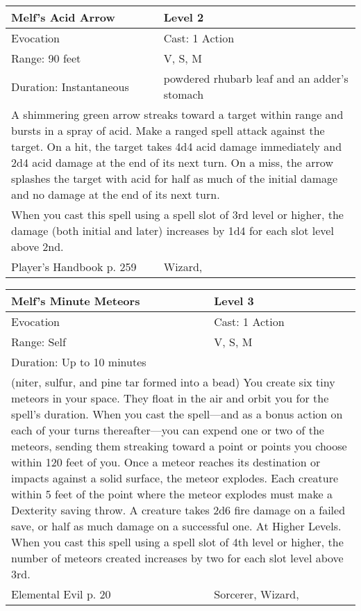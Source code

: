 \documentclass[11pt]{report}
\begin{document}
\begin{table}[H]
	\begin{tabular}{||p{6cm}|p{6cm}||}
		\hline\hline
		\bf{Melf’s Acid Arrow} & Level 2\\ \hline
		Evocation & Cast: 1 Action\\ \hline
		Range: 90 feet & V, S, M\\ \hline
		Duration: Instantaneous & powdered rhubarb leaf and an adder’s stomach\\ \hline
		\multicolumn{2}{||p{12cm}||}{A shimmering green arrow streaks toward a target within range and bursts in a spray of acid.
Make a ranged spell attack against the target. On a hit, the target takes 4d4 acid damage immediately and 2d4 acid damage at the end of its next turn. On a miss, the arrow splashes the target with acid for half as much of the initial damage and no damage at the end of its next turn.}\\ \hline
		\multicolumn{2}{||p{12cm}||}{When you cast this spell using a spell slot of 3rd level or higher, the damage (both initial and later) increases by 1d4 for each slot level above 2nd.}\\ \hline
Player's Handbook p. 259 & Wizard, \\ \hline\hline
	\end{tabular}
\end{table}

\begin{table}[H]
	\begin{tabular}{||p{6cm}|p{6cm}||}
		\hline\hline
		\bf{Melf’s Minute Meteors } & Level 3\\ \hline
		Evocation & Cast: 1 Action\\ \hline
		Range: Self & V, S, M\\ \hline
		Duration: Up to 10 minutes & \\ \hline
		\multicolumn{2}{||p{12cm}||}{(niter, sulfur, and pine tar formed into a bead)
You create six tiny meteors in your space. They float in the air and orbit you for the spell’s duration. When you cast the spell—and as a bonus action on each of your turns thereafter—you can expend one or two of the meteors, sending them streaking toward a point or points you choose within 120 feet of you. Once a meteor reaches its destination or impacts against a solid surface, the meteor explodes. Each creature within 5 feet of the point where the meteor explodes must make a Dexterity saving throw. A creature takes 2d6 fire damage on a failed save, or half as much damage on a successful one.
At Higher Levels. When you cast this spell using a spell slot of 4th level or higher, the number of meteors created increases by two for each slot level above 3rd.}\\ \hline
Elemental Evil p. 20 & Sorcerer, Wizard, \\ \hline\hline
	\end{tabular}
\end{table}
\end{document}
